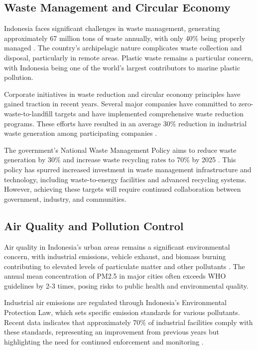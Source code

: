 \subsection{Waste Management and Circular Economy}

Indonesia faces significant challenges in waste management, generating approximately 67 million tons of waste annually, with only 40\% being properly managed \cite{ref_id10}. The country's archipelagic nature complicates waste collection and disposal, particularly in remote areas. Plastic waste remains a particular concern, with Indonesia being one of the world's largest contributors to marine plastic pollution.

Corporate initiatives in waste reduction and circular economy principles have gained traction in recent years. Several major companies have committed to zero-waste-to-landfill targets and have implemented comprehensive waste reduction programs. These efforts have resulted in an average 30\% reduction in industrial waste generation among participating companies \cite{ref_id11}.

The government's National Waste Management Policy aims to reduce waste generation by 30\% and increase waste recycling rates to 70\% by 2025 \cite{ref_id12}. This policy has spurred increased investment in waste management infrastructure and technology, including waste-to-energy facilities and advanced recycling systems. However, achieving these targets will require continued collaboration between government, industry, and communities.

\subsection{Air Quality and Pollution Control}

Air quality in Indonesia's urban areas remains a significant environmental concern, with industrial emissions, vehicle exhaust, and biomass burning contributing to elevated levels of particulate matter and other pollutants \cite{ref_id13}. The annual mean concentration of PM2.5 in major cities often exceeds WHO guidelines by 2-3 times, posing risks to public health and environmental quality.

Industrial air emissions are regulated through Indonesia's Environmental Protection Law, which sets specific emission standards for various pollutants. Recent data indicates that approximately 70\% of industrial facilities comply with these standards, representing an improvement from previous years but highlighting the need for continued enforcement and monitoring \cite{ref_id14}.

